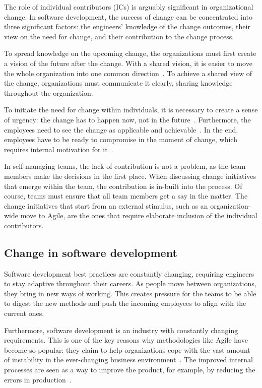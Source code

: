 The role of individual contributors (ICs) is arguably significant in organizational change. In software development, the success of change can be concentrated into three significant factors: the engineers' knowledge of the change outcomes, their view on the need for change, and their contribution to the change process.~\cite{lenberg_initial_2017} 

To spread knowledge on the upcoming change, the organizations must first create a vision of the future after the change. With a shared vision, it is easier to move the whole organization into one common direction~\cite{kotter_leading_1995}. To achieve a shared view of the change, organizations must communicate it clearly, sharing knowledge throughout the organization. 

To initiate the need for change within individuals, it is necessary to create a sense of urgency: the change has to happen now, not in the future~\cite{lenberg_initial_2017}. Furthermore, the employees need to see the change as applicable and achievable~\cite{kotter_leading_1995}. In the end, employees have to be ready to compromise in the moment of change, which requires internal motivation for it~\cite{rehman_psychology_2021}. 

In self-managing teams, the lack of contribution is not a problem, as the team members make the decisions in the first place. When discussing change initiatives that emerge within the team, the contribution is in-built into the process. Of course, teams must ensure that all team members get a say in the matter. The change initiatives that start from an external stimulus, such as an organization-wide move to Agile, are the ones that require elaborate inclusion of the individual contributors. 

\subsection{Change in software development}

Software development best practices are constantly changing, requiring engineers to stay adaptive throughout their careers. As people move between organizations, they bring in new ways of working. This creates pressure for the teams to be able to digest the new methods and push the incoming employees to align with the current ones. 

Furthermore, software development is an industry with constantly changing requirements. This is one of the key reasons why methodologies like Agile have become so popular: they claim to help organizations cope with the vast amount of instability in the ever-changing business environment~\cite{hamed_popular_2013}. The improved internal processes are seen as a way to improve the product, for example, by reducing the errors in production~\cite{cugola_software_1998}.






